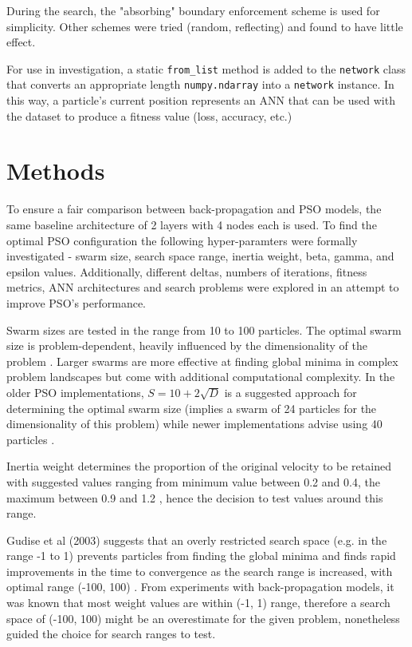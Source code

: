 \documentclass[12pt]{article}
\begin{document}
During the search, the "absorbing" \cite{Chu} boundary enforcement scheme is used
for simplicity. Other schemes were tried (random, reflecting) and found to have
little effect.

For use in investigation, a static \texttt{from\_list} method is added to
the \texttt{network} class that converts an appropriate length \texttt{numpy.ndarray}
into a \texttt{network} instance. In this way, a particle's current position
represents an ANN that can be used with the dataset to produce a fitness value (loss, accuracy, etc.)


\vspace{-1.5em}
\section{Methods}
\vspace{-1.5em}

To ensure a fair comparison between back-propagation and PSO models, the same baseline architecture of 2 layers with 4 nodes each is used. To find the optimal PSO configuration the following hyper-paramters were formally investigated - swarm size, search space range, inertia weight, beta, gamma, and epsilon values. Additionally, different deltas, numbers of iterations, fitness metrics, ANN architectures and search problems were explored in an attempt to improve PSO's performance.

Swarm sizes are tested in the range from 10 to 100 particles. The optimal swarm size is problem-dependent, heavily influenced by the dimensionality of the problem \cite{Razee}. Larger swarms are more effective at finding global minima in complex problem landscapes but come with additional computational complexity. In the older PSO implementations, \(S = 10 + 2\sqrt{D}\) is a suggested approach for determining the optimal swarm size (implies a swarm of 24 particles for the dimensionality of this problem) while newer implementations advise using 40 particles \cite{Clerc}.

Inertia weight determines the proportion of the original velocity to be retained with suggested values ranging from minimum value between 0.2 and 0.4, the maximum between 0.9 and 1.2 \cite{Razee} \cite{Gudise}, hence the decision to test values around this range.

Gudise et al (2003) suggests that an overly restricted search space (e.g. in the range -1 to 1) prevents particles from finding the global minima and finds rapid improvements in the time to convergence as the search range is increased, with optimal range (-100, 100) \cite{Gudise}. From experiments with back-propagation models, it was known that most weight values are within (-1, 1) range, therefore a search space of (-100, 100) might be an overestimate for the given problem, nonetheless guided the choice for search ranges to test.
\end{document}
